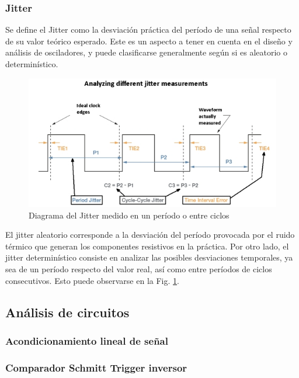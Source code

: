 \subsubsection{Jitter}
Se define el Jitter como la desviaci\'on pr\'actica del per\'iodo de una se\~nal respecto de su valor te\'orico esperado. Este es un aspecto
a tener en cuenta en el dise\~no y an\'alisis de osciladores, y puede clasificarse generalmente seg\'un si es aleatorio o determin\'istico.

\begin{figure}[H]
    \centering
    \includegraphics[scale=0.5]{../EJ3/Recursos/different-jitter-measurements.jpg}
    \caption{Diagrama del Jitter medido en un per\'iodo o entre ciclos}
    \label{fig:jitter_diagram}
\end{figure}

El jitter aleatorio corresponde a la desviaci\'on del per\'iodo provocada por el ruido t\'ermico que generan los componentes resistivos en la pr\'actica.
Por otro lado, el jitter determin\'istico consiste en analizar las posibles desviaciones temporales, ya sea de un per\'iodo respecto del valor real, as\'i
como entre per\'iodos de ciclos consecutivos. Esto puede observarse en la Fig. \ref{fig:jitter_diagram}.

\subsection{An\'alisis de circuitos}

\subsubsection{Acondicionamiento lineal de se\~nal}

\subsubsection{Comparador Schmitt Trigger inversor}


